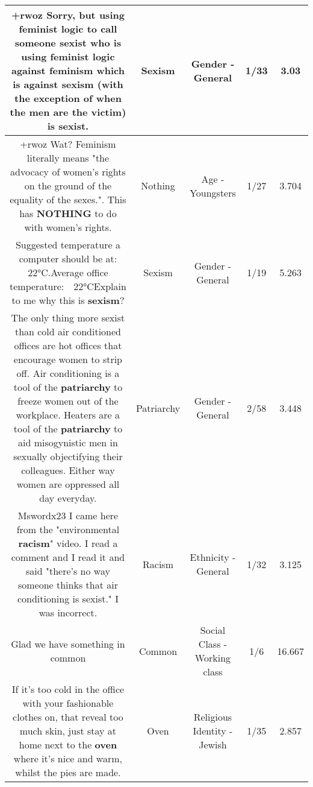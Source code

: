 \documentclass[11pt]{article}
\newlength\mylength
\begin{document}
\begin{center}
\begin{longtable}{|C{.65\mylength}|C{.30\mylength}|C{.12\mylength}|C{.12\mylength}|C{.12\mylength}|}
  \small +rwoz Sorry, but using feminist logic to call someone sexist who is using feminist logic against feminism which is against \textbf{sexism} (with the exception of when the men are the victim) is sexist.\normalsize   & Sexism & Gender - General & 1/33 & 3.03 \\  \hline
  \small +rwoz Wat? Feminism literally means "the advocacy of women's rights on the ground of the equality of the sexes.". This has \textbf{NOTHING} to do with women's rights.\normalsize   & Nothing & Age - Youngsters & 1/27 & 3.704 \\  \hline
  \small Suggested temperature a computer should be at: 22°C.Average office temperature:  22°CExplain to me why this is \textbf{sexism}?\normalsize   & Sexism & Gender - General & 1/19 & 5.263 \\  \hline
  \small The only thing more sexist than cold air conditioned offices are hot offices that encourage women to strip off. Air conditioning is a tool of the \textbf{patriarchy} to freeze women out of the workplace. Heaters are a tool of the \textbf{patriarchy} to aid misogynistic men in sexually objectifying their colleagues. Either way women are oppressed all day everyday.\normalsize   & Patriarchy & Gender - General & 2/58 & 3.448 \\  \hline
  \small Mswordx23 I came here from the "environmental \textbf{racism}" video. I read a comment and I read it and said "there's no way someone thinks that air conditioning is sexist." I was incorrect.\normalsize   & Racism & Ethnicity - General & 1/32 & 3.125 \\  \hline
  \small Glad we have something in common\normalsize   & Common & Social Class - Working class & 1/6 & 16.667 \\  \hline
  \small If it's too cold in the office with your fashionable clothes on, that reveal too much skin, just stay at home next to the \textbf{oven} where it's nice and warm, whilst the pies are made.\normalsize   & Oven & Religious Identity - Jewish & 1/35 & 2.857 \\  \hline

\end{longtable}
\end{center}
\end{document}
